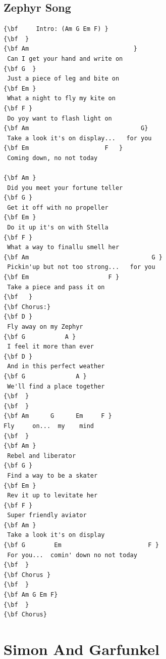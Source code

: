 \documentclass[a4paper]{article}
\begin{document}
\subsection{Zephyr Song}
\begin{multicols}{2}\begin{Verbatim}[commandchars=\\\{\}]
{\bf     Intro: (Am G Em F) }
{\bf  }
{\bf Am                             }
 Can I get your hand and write on 
{\bf G  }
 Just a piece of leg and bite on 
{\bf Em }
 What a night to fly my kite on 
{\bf F }
 Do yoy want to flash light on 
{\bf Am                               G}
 Take a look it's on display...   for you 
{\bf Em                     F   }
 Coming down, no not today 

{\bf Am }
 Did you meet your fortune teller 
{\bf G }
 Get it off with no propeller 
{\bf Em }
 Do it up it's on with Stella 
{\bf F }
 What a way to finallu smell her 
{\bf Am                                  G }
 Pickin'up but not too strong...   for you 
{\bf Em                      F }
 Take a piece and pass it on 
{\bf ￼￼}
{\bf Chorus:}
{\bf D }
 Fly away on my Zephyr 
{\bf G           A }
 I feel it more than ever 
{\bf D }
 And in this perfect weather 
{\bf G              A }
 We'll find a place together
{\bf ￼}
{\bf  }
{\bf Am      G      Em     F }
Fly     on...  my    mind 
{\bf  }
{\bf Am }
 Rebel and liberator 
{\bf G }
 Find a way to be a skater 
{\bf Em }
 Rev it up to levitate her 
{\bf F }
 Super friendly aviator 
{\bf Am }
 Take a look it's on display 
{\bf G        Em                        F }
 For you...  comin' down no not today 
{\bf  }
{\bf Chorus }
{\bf  }
{\bf Am G Em F}
{\bf  }
{\bf Chorus}

\end{Verbatim}
\end{multicols}\newpage
\section{Simon And Garfunkel}
\end{document}
